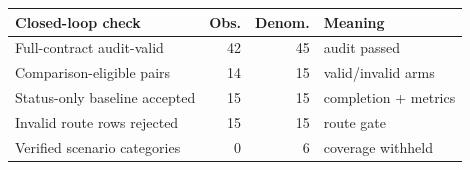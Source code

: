 \begin{tabular}{lrrl}
\toprule
Closed-loop check & Obs. & Denom. & Meaning \\
\midrule
Full-contract audit-valid & 42 & 45 & audit passed \\
Comparison-eligible pairs & 14 & 15 & valid/invalid arms \\
Status-only baseline accepted & 15 & 15 & completion + metrics \\
Invalid route rows rejected & 15 & 15 & route gate \\
Verified scenario categories & 0 & 6 & coverage withheld \\
\bottomrule
\end{tabular}
